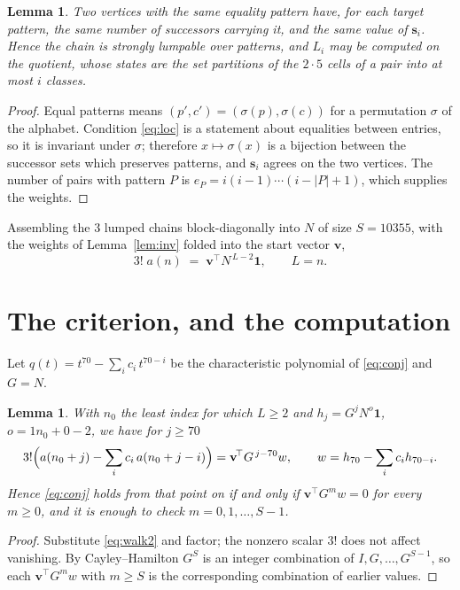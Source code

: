 \documentclass[11pt,a4paper]{article}
\theoremstyle{plain}
\newtheorem{lemma}[theorem]{Lemma}
\theoremstyle{definition}
\begin{document}
\begin{lemma}\label{lem:lump}
Two vertices with the same equality pattern have, for each target pattern, the same number of
successors carrying it, and the same value of $\mathbf{s}_i$. Hence the chain is strongly
lumpable over patterns, and $L_i$ may be computed on the quotient, whose states are the set
partitions of the $2\cdot5$ cells of a pair into at most $i$ classes.
\end{lemma}

\begin{proof}
Equal patterns means $(p',c')=(\sigma(p),\sigma(c))$ for a permutation $\sigma$ of the
alphabet. Condition \eqref{eq:loc} is a statement about equalities between entries, so it is
invariant under $\sigma$; therefore $x\mapsto\sigma(x)$ is a bijection between the successor
sets which preserves patterns, and $\mathbf{s}_i$ agrees on the two vertices. The number of
pairs with pattern $P$ is $e_P=i(i-1)\cdots(i-|P|+1)$, which supplies the weights.
\end{proof}

Assembling the $3$ lumped chains block-diagonally into $N$ of size $S=10355$, with the
weights of Lemma~\ref{lem:inv} folded into the start vector $\mathbf{v}$,
\begin{equation}\label{eq:walk2}
3!\;a(n)\;=\;\mathbf{v}^{\!\top}N^{\,L-2}\mathbf{1},\qquad L=n .
\end{equation}

\section{The criterion, and the computation}

Let $q(t)=t^{70}-\sum_i c_i\,t^{70-i}$ be the characteristic polynomial of
\eqref{eq:conj} and $G=N$.

\begin{lemma}\label{lem:crit}
With $n_0$ the least index for which $L\ge2$ and $h_j=G^{j}N^{o}\mathbf{1}$,
$o=1n_0+0-2$, we have for $j\ge70$
\[
3!\Bigl(a(n_0+j)-\sum_i c_i\,a(n_0+j-i)\Bigr)
=\mathbf{v}^{\!\top}G^{\,j-70}w,\qquad
w=h_{70}-\sum_i c_i h_{70-i} .
\]
Hence \eqref{eq:conj} holds from that point on if and only if
$\mathbf{v}^{\!\top}G^{m}w=0$ for every $m\ge0$, and it is enough to check
$m=0,1,\dots,S-1$.
\end{lemma}

\begin{proof}
Substitute \eqref{eq:walk2} and factor; the nonzero scalar $3!$ does not affect
vanishing. By Cayley--Hamilton $G^{S}$ is an integer combination of $I,G,\dots,G^{S-1}$,
so each $\mathbf{v}^{\!\top}G^{m}w$ with $m\ge S$ is the corresponding combination of
earlier values.
\end{proof}
\end{document}
